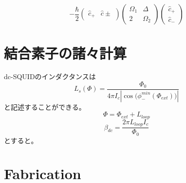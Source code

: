 \begin{equation}
    -\frac{\hbar}{2}\left(\begin{array}{cc}
    \hat{c}_{+} & \hat{c} \pm
    \end{array}\right)\left(\begin{array}{cc}
    \Omega_{1} & \Delta \\
    2 & \Omega_{2}
    \end{array}\right)\left(\begin{array}{l}
    \hat{c}_{+} \\
    \hat{c}_{-}
    \end{array}\right)
\end{equation}
\section{結合素子の諸々計算}
dc-SQUIDのインダクタンスは
\begin{equation}
    L_{s}(\Phi)=\frac{\Phi_0}{4\pi I_{c}|{\cos({\phi_{-}^{min}(\Phi_{ext})}})|}
\end{equation}
と記述することができる。
\begin{equation}
    \Phi=\Phi_{ext}+L_{loop}
\end{equation}
\begin{equation}
    \beta_{dc}=\frac{2\pi L_{loop} I_{c}}{\Phi_{0}}
\end{equation}
とすると。
\section{Fabrication}
